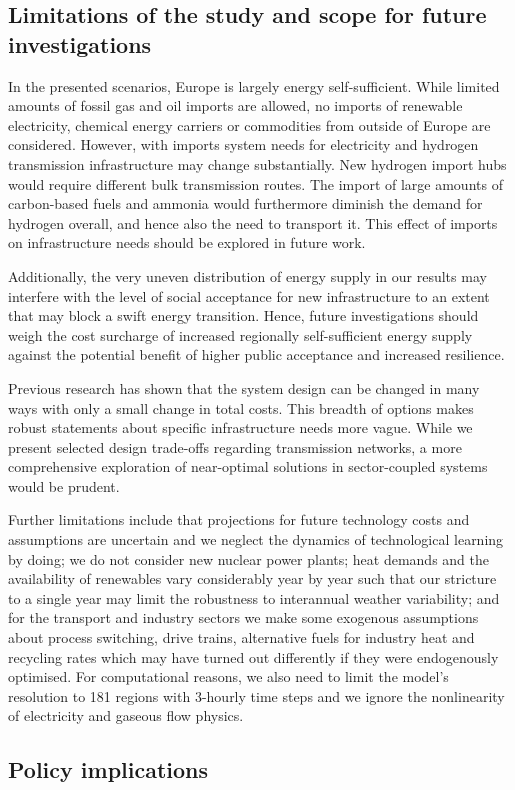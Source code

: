 \subsection*{Limitations of the study and scope for future investigations}

In the presented scenarios, Europe is largely energy self-sufficient. While
limited amounts of fossil gas and oil imports are allowed, no imports of
renewable electricity, chemical energy carriers or commodities from outside of
Europe are considered. However, with imports system needs for electricity and
hydrogen transmission infrastructure may change substantially. New hydrogen
import hubs would require different bulk transmission routes. The import of
large amounts of carbon-based fuels and ammonia would furthermore diminish the
demand for hydrogen overall, and hence also the need to transport it. This
effect of imports on infrastructure needs should be explored in future work.
\cite{fasihiTechnoeconomicAssessment2019,heuserTechnoeconomicAnalysis2019,hamppImportOptions2021}


Additionally, the very uneven distribution of energy supply in our results may
interfere with the level of social acceptance for new infrastructure to an
extent that may block a swift energy transition.
\cite{sasseDistributionalTradeoffs2019,sasseRegionalImpacts2020} Hence, future
investigations should weigh the cost surcharge of increased regionally
self-sufficient energy supply against the potential benefit of higher public
acceptance and increased resilience.

Previous research has shown that the system design can be changed in many ways
with only a small change in total
costs.\cite{Neumann2019,lombardiPolicyDecision2020,pedersenModelingAll2021,pickeringDiversityOptions2022}
This breadth of options makes robust statements about specific infrastructure
needs more vague. While we present selected design trade-offs regarding
transmission networks, a more comprehensive exploration of near-optimal
solutions in sector-coupled systems would be prudent.

Further limitations include that projections for future technology costs and
assumptions are uncertain and we neglect the dynamics of technological learning
by doing; we do not consider new nuclear power plants; heat demands and the
availability of renewables vary considerably year by year such that our
stricture to a single year may limit the robustness to interannual weather
variability; and for the transport and industry sectors we make some exogenous
assumptions about process switching, drive trains, alternative fuels for
industry heat and recycling rates which may have turned out differently if they
were endogenously optimised. For computational reasons, we also need to limit
the model's resolution to 181 regions with 3-hourly time steps and we ignore the
nonlinearity of electricity and gaseous flow physics.



\subsection*{Policy implications}

